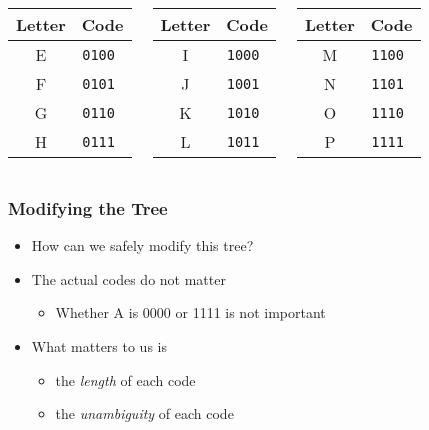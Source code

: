 \begin{frame}
\begin{columns}
    \column{3cm}
    \begin{center}
      \begin{tabular}{cc}
        \textbf{Letter} & \textbf{Code} \\
        \toprule
        E & \tt 0100 \\
        F & \tt 0101 \\
        G & \tt 0110 \\
        H & \tt 0111 \\
      \end{tabular}
    \end{center}

    \column{3cm}
    \begin{center}
      \begin{tabular}{cc}
        \textbf{Letter} & \textbf{Code} \\
        \toprule
        I & \tt 1000 \\
        J & \tt 1001 \\
        K & \tt 1010 \\
        L & \tt 1011 \\
      \end{tabular}
    \end{center}

    \column{3cm}
    \begin{center}
      \begin{tabular}{cc}
        \textbf{Letter} & \textbf{Code} \\
        \toprule
        M & \tt 1100 \\
        N & \tt 1101 \\
        O & \tt 1110 \\
        P & \tt 1111 \\
      \end{tabular}
    \end{center}
  \end{columns}
\end{frame}

\begin{frame}
  \frametitle{Modifying the Tree}
  \begin{itemize}
    \item How can we safely modify this tree?
          \vskip4mm
    \item The actual codes do not matter
          \begin{itemize}
            \item Whether A is 0000 or 1111 is not important
          \end{itemize}
          \vskip4mm
    \item What matters to us is
          \begin{itemize}
            \item the \emph{length} of each code
            \item the \emph{unambiguity} of each code
          \end{itemize}
  \end{itemize}
\end{frame}


